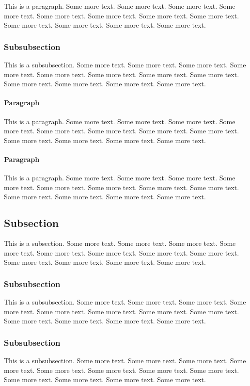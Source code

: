 This is a paragraph. Some more text. Some more text. Some more text. Some more text. Some more text. Some more text. Some more text. Some more text. Some more text. Some more text. Some more text. Some more text. 

\subsubsection{Subsubsection}

This is a subsubsection. Some more text. Some more text. Some more text. Some more text. Some more text. Some more text. Some more text. Some more text. Some more text. Some more text. Some more text. Some more text.  

\paragraph{Paragraph}

This is a paragraph. Some more text. Some more text. Some more text. Some more text. Some more text. Some more text. Some more text. Some more text. Some more text. Some more text. Some more text. Some more text.  

\paragraph{Paragraph}

This is a paragraph. Some more text. Some more text. Some more text. Some more text. Some more text. Some more text. Some more text. Some more text. Some more text. Some more text. Some more text. Some more text. 

\subsection{Subsection}

This is a subsection. Some more text. Some more text. Some more text. Some more text. Some more text. Some more text. Some more text. Some more text. Some more text. Some more text. Some more text. Some more text. 

\subsubsection{Subsubsection}

This is a subsubsection. Some more text. Some more text. Some more text. Some more text. Some more text. Some more text. Some more text. Some more text. Some more text. Some more text. Some more text. Some more text. 

\subsubsection{Subsubsection}

This is a subsubsection. Some more text. Some more text. Some more text. Some more text. Some more text. Some more text. Some more text. Some more text. Some more text. Some more text. Some more text. Some more text. 
